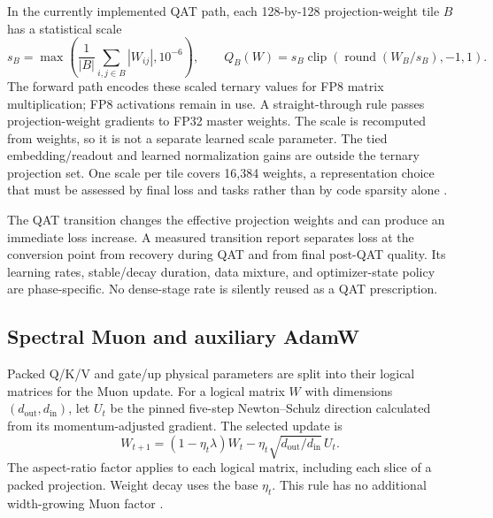 \documentclass[11pt]{article}
\begin{document}
In the currently implemented QAT path, each 128-by-128 projection-weight
tile $B$ has a statistical scale
\begin{equation}
s_B=\max\!\left(\frac{1}{|B|}\sum_{i,j\in B}|W_{ij}|,10^{-6}\right),
\qquad
Q_B(W)=s_B\operatorname{clip}
\!\left(\operatorname{round}(W_B/s_B),-1,1\right).
\end{equation}
The forward path encodes these scaled ternary values for FP8 matrix
multiplication; FP8 activations remain in use. A straight-through rule
passes projection-weight gradients to FP32 master weights. The scale is
recomputed from weights, so it is not a separate learned scale parameter.
The tied embedding/readout and learned normalization gains are outside the
ternary projection set. One scale per tile covers 16,384 weights, a
representation choice that must be assessed by final loss and tasks rather
than by code sparsity alone \cite{bitnet}.

The QAT transition changes the effective projection weights and can
produce an immediate loss increase. A measured transition report separates
loss at the conversion point from recovery during QAT and from final
post-QAT quality. Its learning rates, stable/decay duration, data mixture,
and optimizer-state policy are phase-specific. No dense-stage rate is
silently reused as a QAT prescription.

\subsection{Spectral Muon and auxiliary AdamW}

Packed Q/K/V and gate/up physical parameters are split into their logical
matrices for the Muon update. For a logical matrix $W$ with dimensions
$(d_{\mathrm{out}},d_{\mathrm{in}})$, let $U_t$ be the pinned five-step
Newton--Schulz direction calculated from its momentum-adjusted gradient.
The selected update is
\begin{equation}
W_{t+1}=(1-\eta_t\lambda)W_t-
\eta_t\sqrt{d_{\mathrm{out}}/d_{\mathrm{in}}}\,U_t.
\end{equation}
The aspect-ratio factor applies to each logical matrix, including each
slice of a packed projection. Weight decay uses the base $\eta_t$. This
rule has no additional width-growing Muon factor \cite{muon}.
\end{document}
